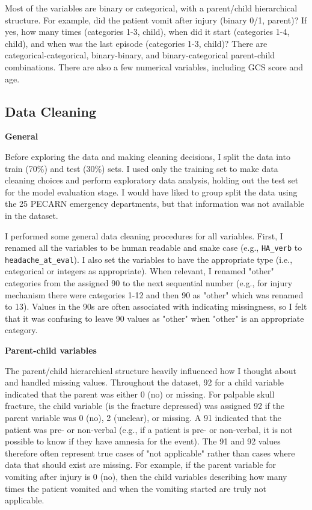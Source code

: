 \documentclass[11pt,letterpaper]{article}
\begin{document}
Most of the variables are binary or categorical, with a parent/child hierarchical structure. For example,
did the patient vomit after injury (binary 0/1, parent)? If yes, how many times (categories 1-3, child), 
when did it start (categories 1-4, child), and when was the last episode (categories 1-3, child)?
There are categorical-categorical, binary-binary, and binary-categorical parent-child combinations.
There are also a few numerical variables, including GCS score and age. 

\subsection{Data Cleaning}\label{data-cleaning}

\textbf{General}

Before exploring the data and making cleaning decisions, I split the data into train (70\%) and test (30\%) sets.
I used only the training set to make data cleaning choices and perform exploratory data analysis,
holding out the test set for the model evaluation stage. I would have liked to group split the data using the 
25 PECARN emergency departments, but that information was not available in the dataset. 

I performed some general data cleaning procedures for all variables. First, I renamed all the variables
to be human readable and snake case (e.g., \texttt{HA\_verb} to \texttt{headache\_at\_eval}). I also set the variables
to have the appropriate type (i.e., categorical or integers as appropriate). When relevant, 
I renamed "other" categories from the assigned 90 to the next sequential number
(e.g., for injury mechanism there were categories 1-12 and then 90 as "other" which was renamed to 13).
Values in the 90s are often associated with indicating missingness, so I felt that it was confusing to 
leave 90 values as "other" when "other" is an appropriate category. 

\textbf{Parent-child variables}

The parent/child hierarchical structure heavily influenced how I thought about and handled missing values.
Throughout the dataset, 92 for a child variable indicated that the parent was either 0 (no) or missing. 
For palpable skull fracture, the child variable (is the fracture depressed) was assigned 92
if the parent variable was 0 (no), 2 (unclear), or missing. A 91 indicated that the patient was pre- or non-verbal 
(e.g., if a patient is pre- or non-verbal, it is not possible to know if they have amnesia for the event). 
The 91 and 92 values therefore often represent true cases of "not applicable" rather than cases 
where data that should exist are missing. For example, if the parent variable for vomiting
after injury is 0 (no), then the child variables describing 
how many times the patient vomited and when the vomiting started are truly not applicable.
\end{document}
